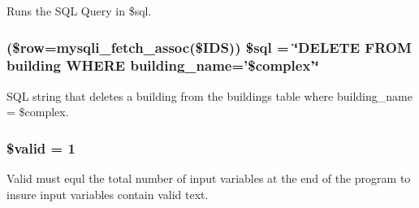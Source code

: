 \-Runs the \-S\-Q\-L \-Query in \$sql. \hypertarget{rmComplex_8php_a44dd5051c0321c5bf69d18bbc8cc43c3}{
\subsubsection[{\$sql}]{ (\$row=mysqli\-\_\-fetch\-\_\-assoc(\$\-I\-D\-S)) \$sql = \char`\"{}\-D\-E\-L\-E\-T\-E \-F\-R\-O\-M building \-W\-H\-E\-R\-E building\-\_\-name='\$complex'\char`\"{}}}\label{rmComplex_8php_a44dd5051c0321c5bf69d18bbc8cc43c3}
\-S\-Q\-L string that deletes a building from the buildings table where building\-\_\-name = \$complex. \hypertarget{rmComplex_8php_a0587674d27d00ef497e08e53ccf45bbb}{
\subsubsection[{\$valid}]{\setlength{\rightskip}{0pt plus 5cm}\$valid = 1}}\label{rmComplex_8php_a0587674d27d00ef497e08e53ccf45bbb}
\-Valid must equl the total number of input variables at the end of the program to insure input variables contain valid text. 